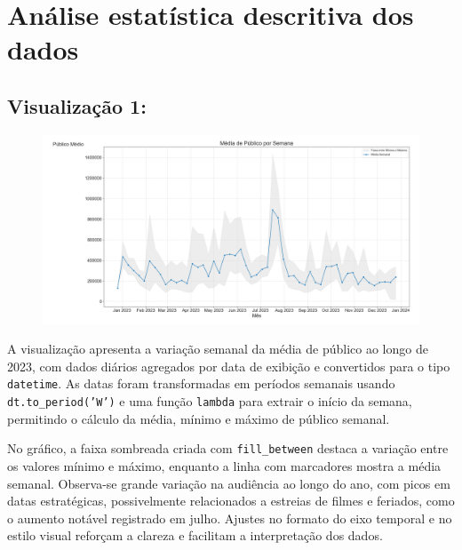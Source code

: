 \documentclass{article}
\begin{document}
\pagebreak
\linespread{1.5}
\section{Análise estatística descritiva dos dados}
\subsection*{Visualização 1:}
\begin{figure}[H]
    \centerline{\includegraphics[width =\linewidth]{img/Figure_1.png}}
\end{figure}
A visualização apresenta a variação semanal da média de público ao longo de 2023, com dados diários agregados por data de exibição e convertidos para o tipo \texttt{datetime}. As datas foram transformadas em períodos semanais usando \texttt{dt.to\_period('W')} e uma função \texttt{lambda} para extrair o início da semana, permitindo o cálculo da média, mínimo e máximo de público semanal.

No gráfico, a faixa sombreada criada com \texttt{fill\_between} destaca a variação entre os valores mínimo e máximo, enquanto a linha com marcadores mostra a média semanal. Observa-se grande variação na audiência ao longo do ano, com picos em datas estratégicas, possivelmente relacionados a estreias de filmes e feriados, como o aumento notável registrado em julho. Ajustes no formato do eixo temporal e no estilo visual reforçam a clareza e facilitam a interpretação dos dados.
\end{document}
